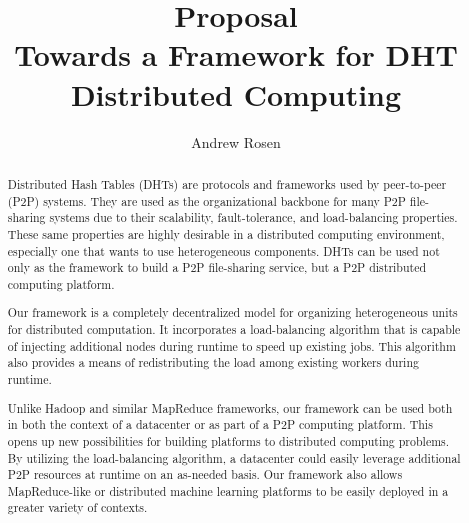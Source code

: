 \documentclass[10pt,letterpaper]{report}
\title{Proposal \\ Towards a Framework for DHT Distributed Computing}
\author{Andrew Rosen}
\begin{document}
\maketitle




\setcounter{tocdepth}{4}
\tableofcontents
\newpage

\begin{abstract}
Distributed Hash Tables (DHTs) are protocols and frameworks used by peer-to-peer (P2P) systems.
They are used as the organizational backbone for many P2P file-sharing systems due to their scalability, fault-tolerance, and load-balancing properties.
These same properties are highly desirable in a distributed computing environment, especially one that wants to use heterogeneous components.
DHTs can be used not only as the framework to build a P2P file-sharing service, but a P2P distributed computing platform.

Our framework is a completely decentralized model for organizing heterogeneous units for distributed computation.
It incorporates a load-balancing algorithm that is capable of injecting additional nodes during runtime to speed up existing jobs.
This algorithm also provides a means of redistributing the load among existing workers during runtime.

Unlike Hadoop and similar MapReduce frameworks, our framework can be used both in both the context of a datacenter or as part of a P2P computing platform.  
This opens up new possibilities for building platforms to distributed computing problems.
By utilizing the load-balancing algorithm, a datacenter could easily leverage additional P2P resources at runtime on an as-needed basis.
Our framework also allows MapReduce-like or distributed machine learning platforms to be easily deployed in a greater variety of contexts.

\end{abstract}






%



\end{document}
